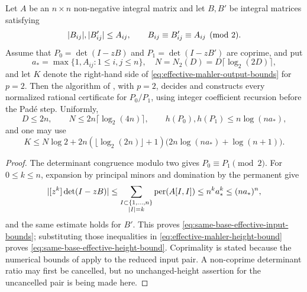 \begin{corollary}
\label{cor:same-base-effective-rational-mahler}
Let \(A\) be an \(n\times n\) non-negative integral matrix and let \(B,B'\)
be integral matrices satisfying
\[
 \lvert B_{ij} \rvert,\lvert B'_{ij} \rvert\le A_{ij},
 \qquad B_{ij}\equiv B'_{ij}\equiv A_{ij}\pmod2.
\]
Assume that
\(P_0=\det(I-zB)\) and \(P_1=\det(I-zB')\) are coprime, and put
\[
 a_*=\max\{1,A_{ij}:1\le i,j\le n\},\quad
 N=N_2(D)=D\lceil\log_2(2D)\rceil,
\]
and let \(K\) denote the right-hand side of
\eqref{eq:effective-mahler-output-bounds} for \(p=2\).  Then the algorithm of
, with \(p=2\), decides and constructs every
normalized rational certificate for \(P_0/P_1\), using integer coefficient
recursion before the Pad\'e step.  Uniformly,
\begin{equation}\label{eq:same-base-effective-input-bounds}
 D\le2n,\qquad N\le2n\lceil\log_2(4n)\rceil,\qquad
 h(P_0),h(P_1)\le n\log(na_*),
\end{equation}
and one may use
\begin{equation}\label{eq:same-base-effective-height-bound}
 K\le N\log2+2n(\lfloor\log_2(2n)\rfloor+1)
       \bigl(2n\log(na_*)+\log(n+1)\bigr).
\end{equation}
\end{corollary}

\begin{proof}
The determinant congruence modulo two gives \(P_0\equiv P_1\pmod2\).
For \(0\le k\le n\), expansion by principal minors and domination by the
permanent give
\[
 \lvert [z^k]\det(I-zB) \rvert
 \le\sum_{\substack{I\subset\{1,\ldots,n\}\\|I|=k}}
       \operatorname{per}(A[I,I])
 \le n^ka_*^k\le(na_*)^n,
\]
and the same estimate holds for \(B'\).  This proves
\eqref{eq:same-base-effective-input-bounds}; substituting those inequalities
in \eqref{eq:effective-mahler-height-bound} proves
\eqref{eq:same-base-effective-height-bound}.  Coprimality is stated because
the numerical bounds of  apply
to the reduced input pair.  A non-coprime determinant ratio may first be
cancelled, but no unchanged-height assertion for the uncancelled pair is
being made here.
\end{proof}

